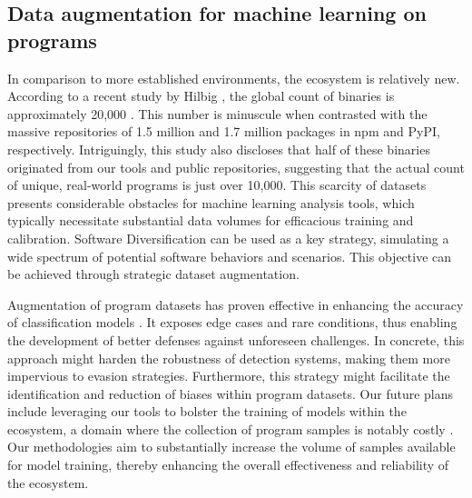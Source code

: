 \subsection{Data augmentation for machine learning on \Wasm programs}
In comparison to more established environments, the \Wasm ecosystem is relatively new. 
According to a recent study by Hilbig \etal, the global count of \Wasm binaries is approximately 20,000  \cite{Hilbig2021AnES}. 
This number is minuscule when contrasted with the massive repositories of 1.5 million and 1.7 million packages in npm and PyPI, respectively. 
Intriguingly, this study also discloses that half of these \Wasm binaries originated from our tools and public repositories, suggesting that the actual count of unique, real-world \Wasm programs is just over 10,000. 
This scarcity of \Wasm datasets presents considerable obstacles for machine learning analysis tools, which typically necessitate substantial data volumes for efficacious training and calibration. 
Software Diversification can be used as a key strategy, simulating a wide spectrum of potential software behaviors and scenarios. 
This objective can be achieved through strategic \Wasm dataset augmentation.


Augmentation of program datasets has proven effective in enhancing the accuracy of classification models \cite{2021arXiv210311882S, selfAPR, 10.1109/TSE.2023.3240118}.
It exposes edge cases and rare conditions, thus enabling the development of better defenses against unforeseen challenges.
In concrete, this approach might harden the robustness of detection systems, making them more impervious to evasion strategies. 
Furthermore, this strategy might facilitate the identification and reduction of biases within \Wasm program datasets.
Our future plans include leveraging our tools to bolster the training of models within the \Wasm ecosystem, a domain where the collection of program samples is notably costly \cite{Hilbig2021AnES, 10174194}. 
Our methodologies aim to substantially increase the volume of samples available for model training, thereby enhancing the overall effectiveness and reliability of the \Wasm ecosystem.

    
